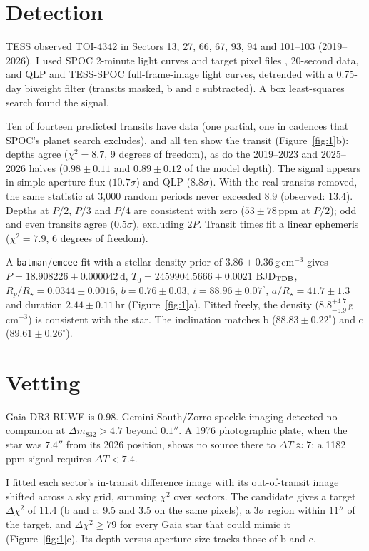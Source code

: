 \documentclass{aastex701}
\begin{document}
\section{Detection}

TESS \citep{2015JATIS...1a4003R} observed TOI-4342 in Sectors 13, 27, 66, 67, 93, 94 and 101--103 (2019--2026). I used SPOC 2-minute light curves and target pixel files \citep{2016SPIE.9913E..3EJ}, 20-second data, and QLP and TESS-SPOC full-frame-image light curves, detrended with a 0.75-day biweight filter (transits masked, b and c subtracted). A box least-squares search found the signal.

Ten of fourteen predicted transits have data (one partial, one in cadences that SPOC's planet search excludes), and all ten show the transit (Figure~\ref{fig:1}b): depths agree ($\chi^2=8.7$, 9 degrees of freedom), as do the 2019--2023 and 2025--2026 halves ($0.98\pm0.11$ and $0.89\pm0.12$ of the model depth). The signal appears in simple-aperture flux ($10.7\sigma$) and QLP ($8.8\sigma$). With the real transits removed, the same statistic at 3,000 random periods never exceeded 8.9 (observed: 13.4). Depths at $P/2$, $P/3$ and $P/4$ are consistent with zero ($53\pm78$\,ppm at $P/2$); odd and even transits agree ($0.5\sigma$), excluding $2P$. Transit times fit a linear ephemeris ($\chi^2=7.9$, 6 degrees of freedom).

A {\tt batman}/{\tt emcee} fit with a stellar-density prior of $3.86\pm0.36$\,g\,cm$^{-3}$ gives $P=18.908226\pm0.000042$\,d, $T_0=2459904.5666\pm0.0021$ BJD$_{\rm TDB}$, $R_p/R_\star=0.0344\pm0.0016$, $b=0.76\pm0.03$, $i=88.96\pm0.07^\circ$, $a/R_\star=41.7\pm1.3$ and duration $2.44\pm0.11$\,hr (Figure~\ref{fig:1}a). Fitted freely, the density ($8.8^{+4.7}_{-5.9}$\,g\,cm$^{-3}$) is consistent with the star. The inclination matches b ($88.83\pm0.22^\circ$) and c ($89.61\pm0.26^\circ$).

\section{Vetting}

Gaia DR3 \citep{2016A&A...595A...1G,2023A&A...674A...1G} RUWE is 0.98. Gemini-South/Zorro speckle imaging \citep{2023AJ....165...93T} detected no companion at $\Delta m_{832}>4.7$ beyond $0.1''$. A 1976 photographic plate, when the star was $7.4''$ from its 2026 position, shows no source there to $\Delta T\approx7$; a 1182\,ppm signal requires $\Delta T<7.4$.

I fitted each sector's in-transit difference image with its out-of-transit image shifted across a sky grid, summing $\chi^2$ over sectors. The candidate gives a target $\Delta\chi^2$ of 11.4 (b and c: 9.5 and 3.5 on the same pixels), a 3$\sigma$ region within $11''$ of the target, and $\Delta\chi^2\ge79$ for every Gaia star that could mimic it (Figure~\ref{fig:1}c). Its depth versus aperture size tracks those of b and c.
\end{document}
